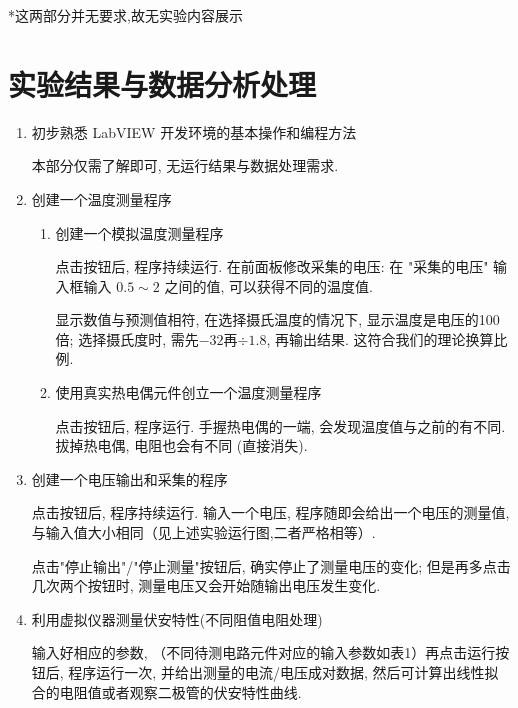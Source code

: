 \documentclass[11pt]{article}
\begin{document}
*这两部分并无要求,故无实验内容展示


\newpage
\section{实验结果与数据分析处理}


\begin{enumerate}

    \item 初步熟悉 LabVIEW 开发环境的基本操作和编程方法
    
    本部分仅需了解即可, 无运行结果与数据处理需求.
    
    \item 创建一个温度测量程序
    
    \begin{enumerate}
        
        \item 创建一个模拟温度测量程序
        
        点击按钮后, 程序持续运行. 在前面板修改采集的电压: 
        在 "采集的电压" 输入框输入 $0.5 \sim 2$ 之间的值, 可以获得不同的温度值. 
        
        显示数值与预测值相符, 在选择摄氏温度的情况下, 显示温度是电压的100倍; 
        选择摄氏度时, 需先$-32$再$\div 1.8$, 再输出结果.
        这符合我们的理论换算比例.
        
        \item 使用真实热电偶元件创立一个温度测量程序
        
        点击按钮后, 程序运行. 手握热电偶的一端, 会发现温度值与之前的有不同. 
        拔掉热电偶, 电阻也会有不同 (直接消失). 
      
    \end{enumerate}
    
    \item 创建一个电压输出和采集的程序
    
    点击按钮后, 程序持续运行. 输入一个电压, 
    程序随即会给出一个电压的测量值, 与输入值大小相同（见上述实验运行图,二者严格相等）.
    
    点击"停止输出"/"停止测量"按钮后, 确实停止了测量电压的变化; 
     但是再多点击几次两个按钮时, 测量电压又会开始随输出电压发生变化.
    
    \item 利用虚拟仪器测量伏安特性(不同阻值电阻处理)
    
    输入好相应的参数, （不同待测电路元件对应的输入参数如表1）再点击运行按钮后, 程序运行一次, 
    并给出测量的电流/电压成对数据, 然后可计算出线性拟合的电阻值或者观察二极管的伏安特性曲线.
   

\end{enumerate}
\end{document}
